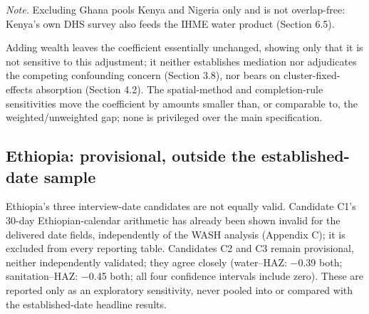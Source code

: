 \begin{ThesisTableNote}

\emph{Note.} Excluding Ghana pools Kenya and Nigeria only and is not overlap-free: Kenya's own DHS survey also feeds the IHME water product (Section 6.5).

\end{ThesisTableNote}

Adding wealth leaves the coefficient essentially unchanged, showing only that it is not sensitive to this adjustment; it neither establishes mediation nor adjudicates the competing confounding concern (Section 3.8), nor bears on cluster-fixed-effects absorption (Section 4.2). The spatial-method and completion-rule sensitivities move the coefficient by amounts smaller than, or comparable to, the weighted/unweighted gap; none is privileged over the main specification.

\subsection{Ethiopia: provisional, outside the established-date sample}\label{sec:5.9}

Ethiopia's three interview-date candidates are not equally valid. Candidate C1's 30-day Ethiopian-calendar arithmetic has already been shown invalid for the delivered date fields, independently of the WASH analysis (Appendix C); it is excluded from every reporting table. Candidates C2 and C3 remain provisional, neither independently validated; they agree closely (water--HAZ: −0.39 both; sanitation--HAZ: −0.45 both; all four confidence intervals include zero). These are reported only as an exploratory sensitivity, never pooled into or compared with the established-date headline results.

